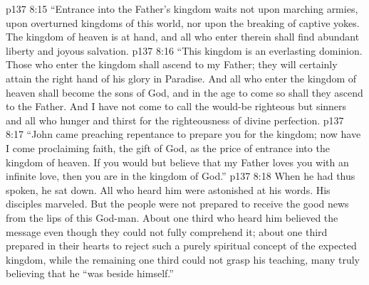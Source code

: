 \vs p137 8:15 \textcolor{ubdarkred}{“Entrance into the Father’s kingdom waits not upon marching armies, upon overturned kingdoms of this world, nor upon the breaking of captive yokes. The kingdom of heaven is at hand, and all who enter therein shall find abundant liberty and joyous salvation.}
\vs p137 8:16 \textcolor{ubdarkred}{“This kingdom is an everlasting dominion. Those who enter the kingdom shall ascend to my Father; they will certainly attain the right hand of his glory in Paradise. And all who enter the kingdom of heaven shall become the sons of God, and in the age to come so shall they ascend to the Father. And I have not come to call the would\hyp{}be righteous but sinners and all who hunger and thirst for the righteousness of divine perfection.}
\vs p137 8:17 \textcolor{ubdarkred}{“John came preaching repentance to prepare you for the kingdom; now have I come proclaiming faith, the gift of God, as the price of entrance into the kingdom of heaven. If you would but believe that my Father loves you with an infinite love, then you are in the kingdom of God.”}
\pc \vs p137 8:18 When he had thus spoken, he sat down. All who heard him were astonished at his words. His disciples marveled. But the people were not prepared to receive the good news from the lips of this God\hyp{}man. About one third who heard him believed the message even though they could not fully comprehend it; about one third prepared in their hearts to reject such a purely spiritual concept of the expected kingdom, while the remaining one third could not grasp his teaching, many truly believing that he “was beside himself.”
